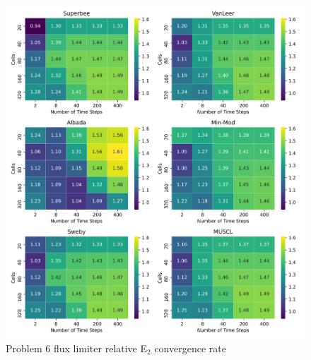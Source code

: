 \clearpage

\begin{figure}[p]
    \centering
    \includegraphics[width=6in]{images/chapter-5/progressionProblems/problem6/problem6E2FluxLimiterConvergenceRate.png}
    \caption{Problem 6 flux limiter relative E${}_{2}$ convergence rate}
    \label{fig:problem6_l2error_fluxlimiter_convergence_rate}
\end{figure}